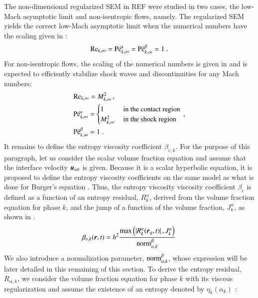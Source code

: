 \documentclass[preprint,10pt]{elsarticle}
\begin{document}
The non-dimensional regularized SEM in REF were studied in two cases, the low-Mach asymptotic limit and non-isentropic flows, namely. The regularized SEM yields the correct low-Mach asymptotic limit when the numerical numbers have the scaling given in :
%
\begin{equation}\label{eq:isent-flow-num-nb}
\Re_{k,\infty} = \Pe_{k,\infty}^\kappa = \Pe_{k,\infty}^\beta =1 \ .
\end{equation}
%
For non-isentropic flows, the scaling of the numerical numbers is given in  and is expected to efficiently stabilize shock waves and discontinuities for any Mach numbers:
%
\begin{align}\label{eq:non-isent-flow-num-nb}
&\textrm{Re}_{k,\infty} = M_{k,\infty}^2 \,, \nonumber \\ 
& \textrm{P\'e}_{k,\infty}^\kappa = 
\begin{cases} 
1              & \text{ in the contact region} \\
M^2_{k,\infty} & \text{ in the shock region } 
\end{cases} \,, \\ 
&\textrm{P\'e}_{k,\infty}^\beta = 1 \ . \nonumber
\end{align}
%
It remains to define the entropy viscosity coefficient $\beta_{e,k}$. For the purpose of this paragraph, let us consider the scalar volume fraction equation and assume that the interface velocity $\boldsymbol u_{int}$ is given. Because it is a scalar hyperbolic equation, it is proposed to define the entropy viscosity coefficients on the same model as what is done for Burger's equation \cite{jlg1, jlg2}. Thus, the entropy viscosity viscosity coefficient $\beta_e$ is defined as a function of an entropy residual, $R_{k}^\alpha$, derived from the volume fraction equation for phase $k$, and the jump of a function of the volume fraction, $J_k^\alpha$, as shown in .
%
\begin{align}\label{eq:def-beta-sen-sect4}
\beta_{e,k}( \boldsymbol r, t) = h^2 \frac{\max\left( | R_{k}^\alpha(\boldsymbol r_q,t) |\,,  J_k^\alpha \right)}{\textrm{norm}_{\alpha, k}^\beta} \,
\end{align}
%
We also introduce a normalization parameter, $\textrm{norm}_{\alpha,k}^\beta$, whose expression will be later detailed in this remaining of this section. To derive the entropy residual, $R_{\alpha,k}$, we consider the volume fraction equation for phase $k$ with its viscous regularization and assume the existence of an entropy denoted by $\eta_k(\alpha_k)$ \cite{Leveque}:
\end{document}
